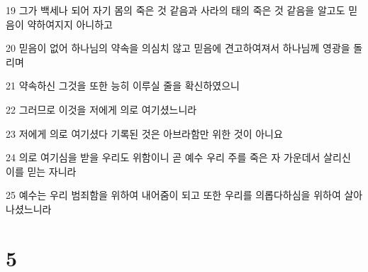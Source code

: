 \par 19 그가 백세나 되어 자기 몸의 죽은 것 같음과 사라의 태의 죽은 것 같음을 알고도 믿음이 약하여지지 아니하고
\par 20 믿음이 없어 하나님의 약속을 의심치 않고 믿음에 견고하여져서 하나님께 영광을 돌리며
\par 21 약속하신 그것을 또한 능히 이루실 줄을 확신하였으니
\par 22 그러므로 이것을 저에게 의로 여기셨느니라
\par 23 저에게 의로 여기셨다 기록된 것은 아브라함만 위한 것이 아니요
\par 24 의로 여기심을 받을 우리도 위함이니 곧 예수 우리 주를 죽은 자 가운데서 살리신 이를 믿는 자니라
\par 25 예수는 우리 범죄함을 위하여 내어줌이 되고 또한 우리를 의롭다하심을 위하여 살아나셨느니라

\chapter{5}


